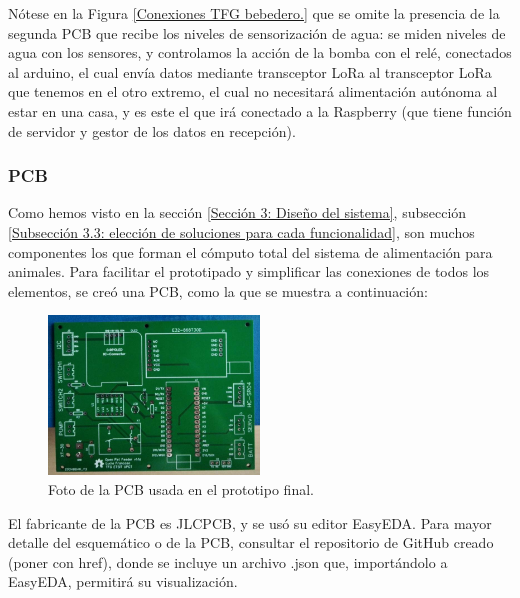 \documentclass[12pt]{article}
\begin{document}
	\noindent Nótese en la Figura \ref{Conexiones TFG bebedero.} que se omite la presencia de la segunda PCB que recibe los niveles de sensorización de agua: se miden niveles de agua con los sensores, y controlamos la acción de la bomba con el relé, conectados al arduino, el cual envía datos mediante transceptor LoRa al transceptor LoRa que tenemos en el otro extremo, el cual no necesitará alimentación autónoma al estar en una casa, y es este el que irá conectado a la Raspberry (que tiene función de servidor y gestor de los datos en recepción). \\
	
	\pagebreak
	
	\subsubsection{PCB}
	
	\noindent Como hemos visto en la sección \ref{Sección 3: Diseño del sistema}, subsección \ref{Subsección 3.3: elección de soluciones para cada funcionalidad}, son muchos componentes los que forman el cómputo total del sistema de alimentación para animales. Para facilitar el prototipado y simplificar las conexiones de todos los elementos, se creó una PCB, como la que se muestra a continuación: \\
	
	\begin{figure}[h]
		\begin{center}
			\includegraphics[width=0.5\textwidth]{img/pcb_v1.1a.png}
			\caption{Foto de la PCB usada en el prototipo final.}
			\label{Foto PCB v1.1a}
		\end{center}
	\end{figure}
	
	\noindent El fabricante de la PCB es JLCPCB, y se usó su editor EasyEDA.  Para mayor detalle del esquemático o de la PCB, consultar el repositorio de GitHub creado (poner  con href), donde se incluye un archivo .json que, importándolo a EasyEDA, permitirá su visualización. \\
	
\end{document}
